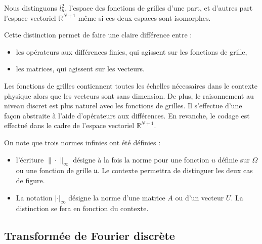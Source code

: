 Nous distinguons $l^2_h$, l'espace des fonctions de grilles d'une part, et d'autres part l'espace vectoriel $\mathbb{R}^{N+1}$ même si ces deux espaces sont isomorphes.

Cette distinction permet de faire une claire différence entre :
\begin{itemize}
\item les opérateurs aux différences finies, qui agissent sur les fonctions de grille,
\item les matrices, qui agissent sur les vecteurs.
\end{itemize}
Les fonctions de grilles contiennent toutes les échelles nécessaires dans le contexte physique alors que les vecteurs sont sans dimension. De plus, le raisonnement au niveau discret est plus naturel avec les fonctions de grilles. Il s'effectue d'une façon abstraite à l'aide d'opérateurs aux différences. En revanche, le codage est effectué dans le cadre de l'espace vectoriel $\mathbb{R}^{N+1}$.

On note que trois normes infinies ont été définies :
\begin{itemize}
\item l'écriture $\| \cdot \|_{\infty}$ désigne à la fois la norme pour une fonction $u$ définie sur $\Omega$ ou une fonction de grille $\mathfrak{u}$. Le contexte permettra de distinguer les deux cas de figure.
\item La notation $| \cdot |_{\infty}$ désigne la norme d'une matrice $A$ ou d'un vecteur $U$. La distinction se fera en fonction du contexte.
\end{itemize}




















\subsection{Transformée de Fourier discrète}

